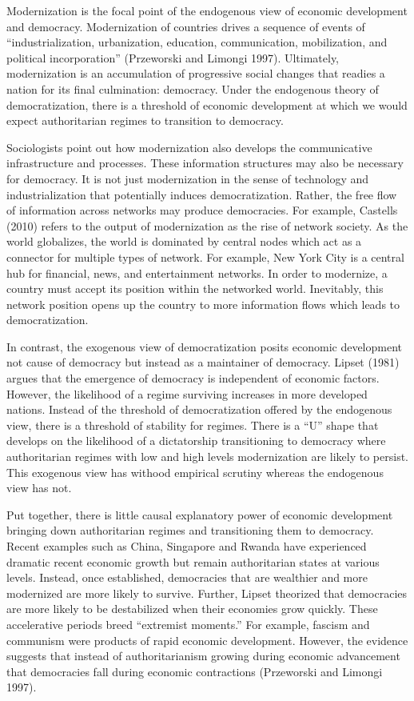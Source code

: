 \documentclass[12pt,]{article}
\begin{document}
Modernization is the focal point of the endogenous view of economic
development and democracy. Modernization of countries drives a sequence
of events of ``industrialization, urbanization, education,
communication, mobilization, and political incorporation'' (Przeworski
and Limongi 1997). Ultimately, modernization is an accumulation of
progressive social changes that readies a nation for its final
culmination: democracy. Under the endogenous theory of democratization,
there is a threshold of economic development at which we would expect
authoritarian regimes to transition to democracy.

Sociologists point out how modernization also develops the communicative
infrastructure and processes. These information structures may also be
necessary for democracy. It is not just modernization in the sense of
technology and industrialization that potentially induces
democratization. Rather, the free flow of information across networks
may produce democracies. For example, Castells (2010) refers to the
output of modernization as the rise of network society. As the world
globalizes, the world is dominated by central nodes which act as a
connector for multiple types of network. For example, New York City is a
central hub for financial, news, and entertainment networks. In order to
modernize, a country must accept its position within the networked
world. Inevitably, this network position opens up the country to more
information flows which leads to democratization.

In contrast, the exogenous view of democratization posits economic
development not cause of democracy but instead as a maintainer of
democracy. Lipset (1981) argues that the emergence of democracy is
independent of economic factors. However, the likelihood of a regime
surviving increases in more developed nations. Instead of the threshold
of democratization offered by the endogenous view, there is a threshold
of stability for regimes. There is a ``U'' shape that develops on the
likelihood of a dictatorship transitioning to democracy where
authoritarian regimes with low and high levels modernization are likely
to persist. This exogenous view has withood empirical scrutiny whereas
the endogenous view has not.

Put together, there is little causal explanatory power of economic
development bringing down authoritarian regimes and transitioning them
to democracy. Recent examples such as China, Singapore and Rwanda have
experienced dramatic recent economic growth but remain authoritarian
states at various levels. Instead, once established, democracies that
are wealthier and more modernized are more likely to survive. Further,
Lipset theorized that democracies are more likely to be destabilized
when their economies grow quickly. These accelerative periods breed
``extremist moments.'' For example, fascism and communism were products
of rapid economic development. However, the evidence suggests that
instead of authoritarianism growing during economic advancement that
democracies fall during economic contractions (Przeworski and Limongi
1997).
\end{document}
